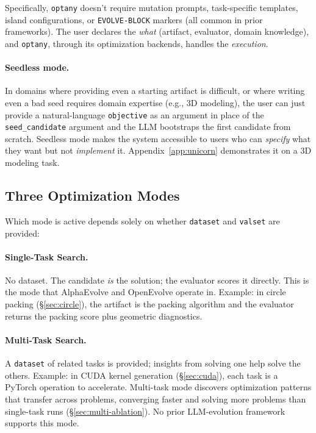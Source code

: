 \documentclass[sigconf,anonymous,review]{acmart}
\newcommand{\oa}{\texttt{optany}}
\begin{document}
Specifically, \oa{} doesn't require mutation prompts, task-specific templates, island configurations, or \texttt{EVOLVE-BLOCK} markers (all common in prior frameworks). The user declares the \emph{what} (artifact, evaluator, domain knowledge), and \oa{}, through its optimization backends, handles the \emph{execution}.

\paragraph{Seedless mode.} In domains where providing even a starting artifact is difficult, or where writing even a bad seed requires domain expertise (e.g., 3D modeling), the user can just provide a natural-language \texttt{objective} as an argument in place of the \texttt{seed\_candidate} argument and the LLM bootstraps the first candidate from scratch. Seedless mode makes the system accessible to users who can \emph{specify} what they want but not \emph{implement} it. Appendix~\ref{app:unicorn} demonstrates it on a 3D modeling task.

\subsection{Three Optimization Modes}\label{sec:modes}

Which mode is active depends solely on whether \texttt{dataset} and \texttt{valset} are provided:

\paragraph{Single-Task Search.} No dataset. The candidate \emph{is} the solution; the evaluator scores it directly. This is the mode that AlphaEvolve and OpenEvolve operate in. Example: in circle packing (\S\ref{sec:circle}), the artifact is the packing algorithm and the evaluator returns the packing score plus geometric diagnostics.

\paragraph{Multi-Task Search.} A \texttt{dataset} of related tasks is provided; insights from solving one help solve the others. Example: in CUDA kernel generation (\S\ref{sec:cuda}), each task is a PyTorch operation to accelerate. Multi-task mode discovers optimization patterns that transfer across problems, converging faster and solving more problems than single-task runs (\S\ref{sec:multi-ablation}). No prior LLM-evolution framework supports this mode.
\end{document}
